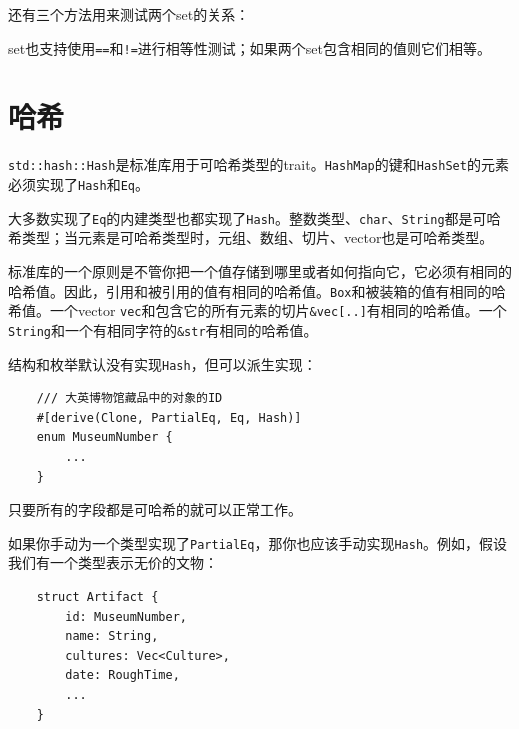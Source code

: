 


还有三个方法用来测试两个set的关系：




set也支持使用\texttt{==}和\texttt{!=}进行相等性测试；如果两个set包含相同的值则它们相等。

\section{哈希}

\texttt{std::hash::Hash}是标准库用于可哈希类型的trait。\texttt{HashMap}的键和\texttt{HashSet}的元素必须实现了\texttt{Hash}和\texttt{Eq}。

大多数实现了\texttt{Eq}的内建类型也都实现了\texttt{Hash}。整数类型、\texttt{char}、\texttt{String}都是可哈希类型；当元素是可哈希类型时，元组、数组、切片、vector也是可哈希类型。

标准库的一个原则是不管你把一个值存储到哪里或者如何指向它，它必须有相同的哈希值。因此，引用和被引用的值有相同的哈希值。\texttt{Box}和被装箱的值有相同的哈希值。一个vector \texttt{vec}和包含它的所有元素的切片\texttt{\&vec[..]}有相同的哈希值。一个\texttt{String}和一个有相同字符的\texttt{\&str}有相同的哈希值。

结构和枚举默认没有实现\texttt{Hash}，但可以派生实现：
\begin{verbatim}
    /// 大英博物馆藏品中的对象的ID
    #[derive(Clone, PartialEq, Eq, Hash)]
    enum MuseumNumber {
        ...
    }
\end{verbatim}
只要所有的字段都是可哈希的就可以正常工作。

如果你手动为一个类型实现了\texttt{PartialEq}，那你也应该手动实现\texttt{Hash}。例如，假设我们有一个类型表示无价的文物：
\begin{verbatim}
    struct Artifact {
        id: MuseumNumber,
        name: String,
        cultures: Vec<Culture>,
        date: RoughTime,
        ...
    }
\end{verbatim}

